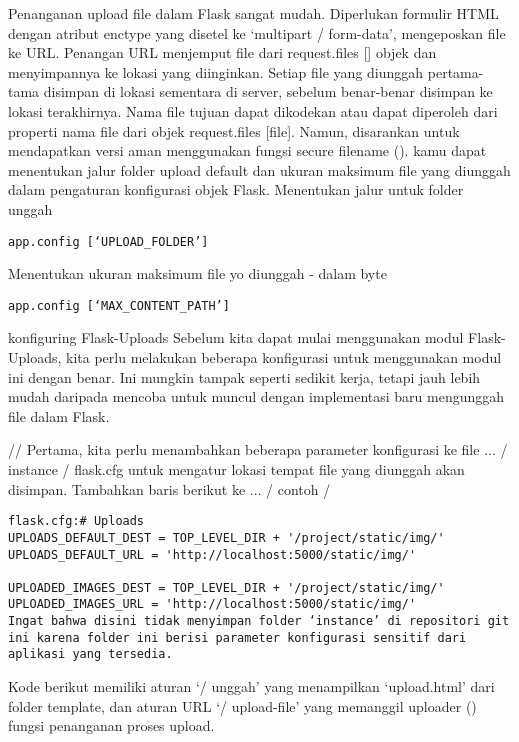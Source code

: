 \documentclass[12pt,a4paper]{article}
\begin{document}
Penanganan upload file dalam Flask sangat mudah. Diperlukan formulir HTML dengan atribut enctype yang disetel ke ‘multipart / form-data’, mengeposkan file ke URL. Penangan URL menjemput file dari request.files [] objek dan menyimpannya ke lokasi yang diinginkan.
	Setiap file yang diunggah pertama-tama disimpan di lokasi sementara di server, sebelum benar-benar disimpan ke lokasi terakhirnya. Nama file tujuan dapat dikodekan atau dapat diperoleh dari properti nama file dari objek request.files [file]. Namun, disarankan untuk mendapatkan versi aman menggunakan fungsi secure filename ().
kamu dapat menentukan jalur folder upload default dan ukuran maksimum file yang diunggah dalam pengaturan konfigurasi objek Flask.
Menentukan jalur untuk folder unggah
\begin{verbatim}
app.config [‘UPLOAD_FOLDER’] 
\end{verbatim}
Menentukan ukuran maksimum file yo diunggah - dalam byte
\begin{verbatim}
app.config [‘MAX_CONTENT_PATH’] 
\end{verbatim}



konfiguring Flask-Uploads
Sebelum kita dapat mulai menggunakan modul Flask-Uploads, kita perlu melakukan beberapa konfigurasi untuk menggunakan modul ini dengan benar. Ini mungkin tampak seperti sedikit kerja, tetapi jauh lebih mudah daripada mencoba untuk muncul dengan implementasi baru mengunggah file dalam Flask.

// Pertama, kita perlu menambahkan beberapa parameter konfigurasi ke file ... / instance / flask.cfg untuk mengatur lokasi tempat file yang diunggah akan disimpan. Tambahkan baris berikut ke ... / contoh / 

\begin{verbatim}
flask.cfg:# Uploads
UPLOADS_DEFAULT_DEST = TOP_LEVEL_DIR + '/project/static/img/'
UPLOADS_DEFAULT_URL = 'http://localhost:5000/static/img/'
 
UPLOADED_IMAGES_DEST = TOP_LEVEL_DIR + '/project/static/img/'
UPLOADED_IMAGES_URL = 'http://localhost:5000/static/img/'
Ingat bahwa disini tidak menyimpan folder ‘instance’ di repositori git ini karena folder ini berisi parameter konfigurasi sensitif dari aplikasi yang tersedia.

\end{verbatim}


Kode berikut memiliki aturan ‘/ unggah’ yang menampilkan ‘upload.html’ dari folder template, dan aturan URL ‘/ upload-file’ yang memanggil uploader () fungsi penanganan proses upload.
\end{document}
